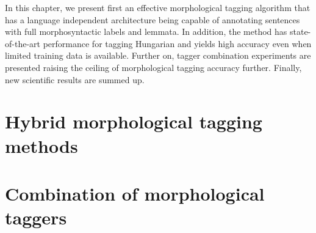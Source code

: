 In this chapter, we present first an effective morphological tagging algorithm that has a language independent architecture being capable of annotating sentences with full morphosyntactic labels and lemmata. 
In addition, the method has state-of-the-art performance for tagging Hungarian and yields high accuracy even when limited training data is available. 
Further on, tagger combination experiments are presented raising the ceiling of morphological tagging accuracy further. 
Finally, new scientific results are summed up.



\section{Hybrid morphological tagging methods}\label{sec:tagging}



\section{Combination of morphological taggers}\label{sec:combination}


 

